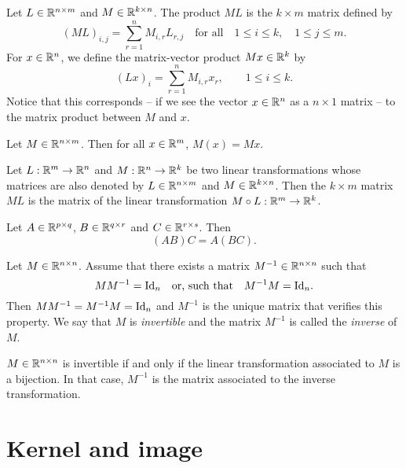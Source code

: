 \documentclass[11pt,nocut]{article}
\begin{document}
\begin{definition}
	Let $L \in \mathbb{R}^{n \times m}$ and $M \in \mathbb{R}^{k \times n}$. The product $M L$ is the $k \times m$ matrix defined by
	$$
	(ML)_{i,j} = \sum_{r=1}^n M_{i,r} L_{r,j} \quad \text{for all} \quad 1 \leq i \leq k, \quad 1 \leq j \leq m.
	$$
	For $x \in \mathbb{R}^n$, we define the matrix-vector product $M x \in \mathbb{R}^k$ by
	$$
	(Lx)_i = \sum_{r=1}^n M_{i,r} x_r, \qquad 1 \leq i \leq k.
	$$
	Notice that this corresponds -- if we see the vector $x \in \mathbb{R}^n$ as a $n \times 1$ matrix -- to the matrix product between $M$ and $x$.
\end{definition}

\begin{proposition}
	Let $M \in \mathbb{R}^{n \times m}$. Then for all $x \in \mathbb{R}^m$,
	$M(x) = Mx$.
\end{proposition}

\begin{proposition}
	Let $L: \mathbb{R}^m \to \mathbb{R}^n$ and $M: \mathbb{R}^n \to \mathbb{R}^k$ be two linear transformations whose matrices are also denoted by $L \in \mathbb{R}^{n \times m}$ and $M \in \mathbb{R}^{k \times n}$.
	Then the $k \times m$ matrix $ML$ is the matrix of the linear transformation $M \circ L: \mathbb{R}^m \to \mathbb{R}^k$.
\end{proposition}

\begin{proposition}
	Let $A \in \mathbb{R}^{p \times q}$, $B \in \mathbb{R}^{q \times r}$ and $C \in \mathbb{R}^{r \times s}$. Then
	$$
	(AB) C = A (BC).
	$$
\end{proposition}

\begin{definition}
	Let $M \in \mathbb{R}^{n \times n}$. Assume that there exists a matrix $M^{-1} \in \mathbb{R}^{n \times n}$ such that 
	$$
	M M^{-1} = {{\rm Id}}_n \quad \text{or, such that} \quad M^{-1} M = {{\rm Id}}_n.
	$$
	Then $M M^{-1} = M^{-1} M = {{\rm Id}}_n$ and $M^{-1}$ is the unique matrix that verifies this property.
	We say that $M$ is \emph{invertible} and the matrix $M^{-1}$ is called the \emph{inverse} of $M$.
\end{definition}

\begin{remark}
	$M \in \mathbb{R}^{n \times n}$ is invertible if and only if the linear transformation associated to $M$ is a bijection. In that case, $M^{-1}$ is the matrix associated to the inverse transformation.
\end{remark}

\section{Kernel and image}
\end{document}
